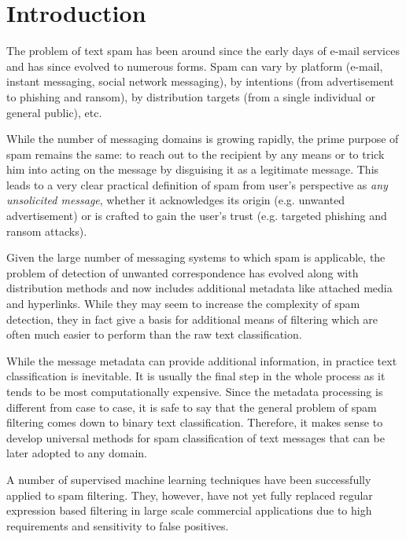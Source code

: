 \documentclass[12pt]{report}
\begin{document}
\renewcommand{\bibname}{References}
\setcounter{tocdepth}{1}

\setcounter{page}{2}

\large

\thispagestyle{empty}
\tableofcontents


\chapter*{Introduction}

The problem of text spam has been around since the early days of e-mail services and has since evolved to numerous forms. Spam can vary by platform (e-mail, instant messaging, social network messaging), by intentions (from advertisement to phishing and ransom), by distribution targets (from a single individual or general public), etc.

While the number of messaging domains is growing rapidly, the prime purpose of spam remains the same: to reach out to the recipient by any means or to trick him into acting on the message by disguising it as a legitimate message. This leads to a very clear practical definition of spam from user's perspective as \textit{any unsolicited message}, whether it acknowledges its origin (e.g. unwanted advertisement) or is crafted to gain the user's trust (e.g. targeted phishing and ransom attacks).

Given the large number of messaging systems to which spam is applicable, the problem of detection of unwanted correspondence has evolved along with distribution methods and now includes additional metadata like attached media and hyperlinks. While they may seem to increase the complexity of spam detection, they in fact give a basis for additional means of filtering which are often much easier to perform than the raw text classification.

While the message metadata can provide additional information, in practice text classification is inevitable. It is usually the final step in the whole process as it tends to be most computationally expensive. Since the metadata processing is different from case to case, it is safe to say that the general problem of spam filtering comes down to binary text classification. Therefore, it makes sense to develop universal methods for spam classification of text messages that can be later adopted to any domain.

A number of supervised machine learning techniques have been successfully applied to spam filtering. They, however, have not yet fully replaced regular expression based filtering in large scale commercial applications due to high requirements and sensitivity to false positives.
\end{document}
